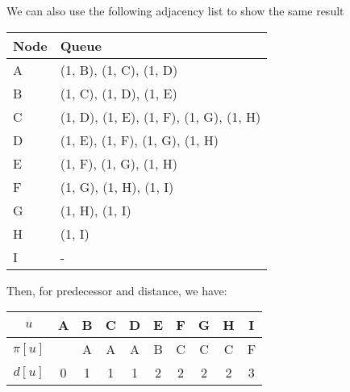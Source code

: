 \begin{eg}
    We can also use the following adjacency list to show the same result
    \begin{table}[H]
      \centering
      \begin{tabular}{l|l}
          Node & Queue  \\
        \midrule
          A & (1, B), (1, C), (1, D) \\
          B & (1, C), (1, D), (1, E) \\
          C & (1, D), (1, E), (1, F), (1, G), (1, H) \\
          D & (1, E), (1, F), (1, G), (1, H) \\
          E & (1, F), (1, G), (1, H) \\
          F & (1, G), (1, H), (1, I) \\
          G & (1, H), (1, I) \\
          H & (1, I) \\
          I & -
      \end{tabular}
    \end{table}
  Then, for predecessor and distance, we have:
  \begin{table}[H]
    \centering
    \begin{tabular}{c|c|c|c|c|c|c|c|c|c}
      \(u\)  & A & B & C & D & E & F & G & H & I  \\
      \midrule
      \(\pi[u]\) &   & A & A & A & B & C & C & C & F \\
      \midrule
      \(d[u]\) & 0 & 1 & 1 & 1 & 2 & 2 & 2 & 2 & 3 \\
    \end{tabular}
  \end{table}
\end{eg}

